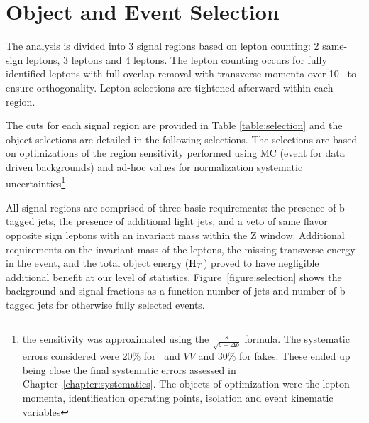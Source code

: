 \chapter[Object and Event Selection][Object and Event Selection]{Object and Event Selection}
\label{chapter:selection}

The analysis is divided into 3 signal regions based
on lepton counting: 2 same-sign leptons, 3 leptons and 4 leptons. The lepton
counting occurs for fully identified leptons with full overlap removal with
transverse momenta over 10 \gev\ to ensure orthogonality. Lepton selections are tightened
afterward within each region.

The cuts for each signal region are provided in Table \ref{table:selection} and the object selections are detailed in the
following selections. The selections are based on optimizations of the region sensitivity
performed using MC (event for data driven backgrounds) and ad-hoc values for normalization systematic uncertainties\footnote{the sensitivity was approximated using the $\frac{s}{\sqrt{b + \Delta b}}$ formula. The systematic errors considered were 20\% for \ttV\ and $VV$ and 30\% for fakes. These ended up being close the final systematic errors assessed in Chapter~\ref{chapter:systematics}. The objects of optimization were the lepton momenta, identification operating points, isolation and event kinematic variables} 

All signal regions are comprised of three basic requirements: the presence of b-tagged
jets, the presence of additional light jets, and a veto of same flavor opposite sign leptons with an
invariant mass within the Z window. Additional requirements on the invariant mass of the leptons, the missing transverse energy
in the event, and the total object energy ($\rm H_{T}$) proved to have negligible additional benefit at our level of 
statistics. Figure~\ref{figure:selection} shows the background and signal fractions as a function number of jets and 
number of b-tagged jets for otherwise fully selected events. 

